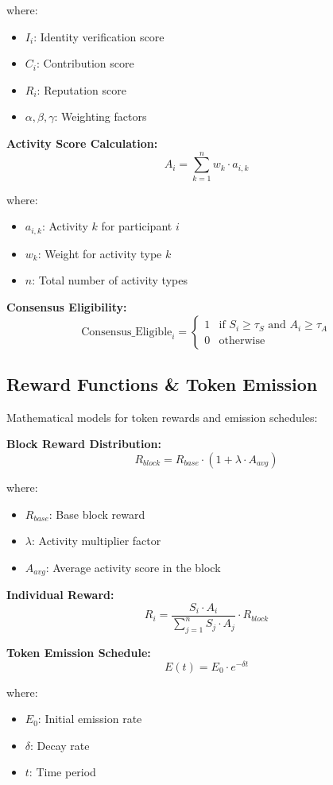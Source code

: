 \documentclass[11pt,a4paper]{article}
\begin{document}
where:
\begin{itemize}
    \item $I_i$: Identity verification score
    \item $C_i$: Contribution score
    \item $R_i$: Reputation score
    \item $\alpha, \beta, \gamma$: Weighting factors
\end{itemize}

\textbf{Activity Score Calculation:}
$$A_i = \sum_{k=1}^{n} w_k \cdot a_{i,k}$$

where:
\begin{itemize}
    \item $a_{i,k}$: Activity $k$ for participant $i$
    \item $w_k$: Weight for activity type $k$
    \item $n$: Total number of activity types
\end{itemize}

\textbf{Consensus Eligibility:}
$$\text{Consensus\_Eligible}_i = \begin{cases} 
1 & \text{if } S_i \geq \tau_S \text{ and } A_i \geq \tau_A \\
0 & \text{otherwise}
\end{cases}$$

\subsection{Reward Functions \& Token Emission}
Mathematical models for token rewards and emission schedules:

\textbf{Block Reward Distribution:}
$$R_{block} = R_{base} \cdot (1 + \lambda \cdot A_{avg})$$

where:
\begin{itemize}
    \item $R_{base}$: Base block reward
    \item $\lambda$: Activity multiplier factor
    \item $A_{avg}$: Average activity score in the block
\end{itemize}

\textbf{Individual Reward:}
$$R_i = \frac{S_i \cdot A_i}{\sum_{j=1}^{n} S_j \cdot A_j} \cdot R_{block}$$

\textbf{Token Emission Schedule:}
$$E(t) = E_0 \cdot e^{-\delta t}$$

where:
\begin{itemize}
    \item $E_0$: Initial emission rate
    \item $\delta$: Decay rate
    \item $t$: Time period
\end{itemize}
\end{document}
